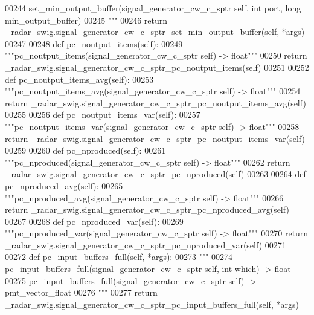 \begin{DoxyCode}
{{{00244 \textcolor{stringliteral}{        set\_min\_output\_buffer(signal\_generator\_cw\_c\_sptr self, int port, long min\_output\_buffer)}
00245 \textcolor{stringliteral}{        """}
00246         \textcolor{keywordflow}{return} \_radar\_swig.signal\_generator\_cw\_c\_sptr\_set\_min\_output\_buffer(self, *args)
00247 
00248     \textcolor{keyword}{def }pc_noutput_items(self):
00249         \textcolor{stringliteral}{"""pc\_noutput\_items(signal\_generator\_cw\_c\_sptr self) -> float"""}
00250         \textcolor{keywordflow}{return} \_radar\_swig.signal\_generator\_cw\_c\_sptr\_pc\_noutput\_items(self)
00251 
00252     \textcolor{keyword}{def }pc_noutput_items_avg(self):
00253         \textcolor{stringliteral}{"""pc\_noutput\_items\_avg(signal\_generator\_cw\_c\_sptr self) -> float"""}
00254         \textcolor{keywordflow}{return} \_radar\_swig.signal\_generator\_cw\_c\_sptr\_pc\_noutput\_items\_avg(self)
00255 
00256     \textcolor{keyword}{def }pc_noutput_items_var(self):
00257         \textcolor{stringliteral}{"""pc\_noutput\_items\_var(signal\_generator\_cw\_c\_sptr self) -> float"""}
00258         \textcolor{keywordflow}{return} \_radar\_swig.signal\_generator\_cw\_c\_sptr\_pc\_noutput\_items\_var(self)
00259 
00260     \textcolor{keyword}{def }pc_nproduced(self):
00261         \textcolor{stringliteral}{"""pc\_nproduced(signal\_generator\_cw\_c\_sptr self) -> float"""}
00262         \textcolor{keywordflow}{return} \_radar\_swig.signal\_generator\_cw\_c\_sptr\_pc\_nproduced(self)
00263 
00264     \textcolor{keyword}{def }pc_nproduced_avg(self):
00265         \textcolor{stringliteral}{"""pc\_nproduced\_avg(signal\_generator\_cw\_c\_sptr self) -> float"""}
00266         \textcolor{keywordflow}{return} \_radar\_swig.signal\_generator\_cw\_c\_sptr\_pc\_nproduced\_avg(self)
00267 
00268     \textcolor{keyword}{def }pc_nproduced_var(self):
00269         \textcolor{stringliteral}{"""pc\_nproduced\_var(signal\_generator\_cw\_c\_sptr self) -> float"""}
00270         \textcolor{keywordflow}{return} \_radar\_swig.signal\_generator\_cw\_c\_sptr\_pc\_nproduced\_var(self)
00271 
00272     \textcolor{keyword}{def }pc_input_buffers_full(self, *args):
00273         \textcolor{stringliteral}{"""}
00274 \textcolor{stringliteral}{        pc\_input\_buffers\_full(signal\_generator\_cw\_c\_sptr self, int which) -> float}
00275 \textcolor{stringliteral}{        pc\_input\_buffers\_full(signal\_generator\_cw\_c\_sptr self) -> pmt\_vector\_float}
00276 \textcolor{stringliteral}{        """}
00277         \textcolor{keywordflow}{return} \_radar\_swig.signal\_generator\_cw\_c\_sptr\_pc\_input\_buffers\_full(self, *args)
}}}
\end{DoxyCode}
